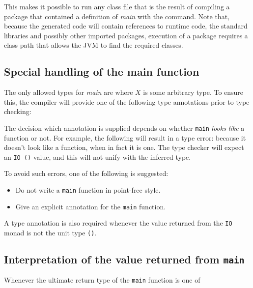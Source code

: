 This makes it possible to run any class file that is the result of compiling a \frege{} package that contained a definition of \emph{main} with the  command. Note that, because the generated \java{} code will contain references to \frege{} runtime code, the standard libraries and possibly other imported \frege{} packages, execution of a \frege{} package requires a class path that allows the JVM to find the required classes.


\subsection*{Special handling of the main function}

The only allowed types for \emph{main} are 
where $X$ is some arbitrary type. 
To ensure this, the compiler will provide one of the following type annotations prior to type checking: 

The decision which annotation is supplied depends on whether \texttt{main} \emph{looks like} a function or not.
For example, the following will result in a type error: 
because it doesn't look like a function, when in fact it is one.  
The type checker will expect an \texttt{IO ()} value, and this will not unify with the inferred type.

To avoid such errors, one of the following is suggested:
\begin{itemize}
\item Do not write a \texttt{main} function in point-free style.
\item Give an explicit annotation for the \texttt{main} function.
\end{itemize}

A type annotation is also required whenever the value returned from the \texttt{IO} monad is not the unit type \texttt{()}.

\subsection*{Interpretation of the value returned from \texttt{main}}

Whenever the ultimate return type of the \texttt{main} function is one of 

